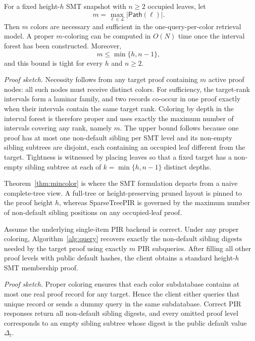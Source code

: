 \begin{theorem}
\label{thm:mincolor}
For a fixed height-$h$ SMT snapshot with $n\ge2$ occupied leaves, let
\[
    m=\max_{\ell\in\mathcal{L}}|\mathsf{Path}(\ell)|.
\]
Then $m$ colors are necessary and sufficient in the one-query-per-color retrieval model. A proper $m$-coloring can be computed in $O(N)$ time once the interval forest has been constructed. Moreover,
\[
m\le \min\{h,n-1\},
\]
and this bound is tight for every $h$ and $n\ge 2$.
\end{theorem}

\noindent\emph{Proof sketch.}
Necessity follows from any target proof containing $m$ active proof nodes: all such nodes must receive distinct colors. For sufficiency, the target-rank intervals form a laminar family, and two records co-occur in one proof exactly when their intervals contain the same target rank. Coloring by depth in the interval forest is therefore proper and uses exactly the maximum number of intervals covering any rank, namely $m$. The upper bound follows because one proof has at most one non-default sibling per SMT level and its non-empty sibling subtrees are disjoint, each containing an occupied leaf different from the target. Tightness is witnessed by placing leaves so that a fixed target has a non-empty sibling subtree at each of $k=\min\{h,n-1\}$ distinct depths.

\begin{remark}
Theorem~\ref{thm:mincolor} is where the SMT formulation departs from a naive complete-tree view. A full-tree or height-preserving pruned layout is pinned to the proof height $h$, whereas SparseTreePIR is governed by the maximum number of non-default sibling positions on any occupied-leaf proof.
\end{remark}

\begin{theorem}
\label{thm:correctness}
Assume the underlying single-item PIR backend is correct. Under any proper coloring, Algorithm~\ref{alg:query} recovers exactly the non-default sibling digests needed by the target proof using exactly $m$ PIR subqueries. After filling all other proof levels with public default hashes, the client obtains a standard height-$h$ SMT membership proof.
\end{theorem}

\noindent\emph{Proof sketch.}
Proper coloring ensures that each color subdatabase contains at most one real proof record for any target. Hence the client either queries that unique record or sends a dummy query in the same subdatabase. Correct PIR responses return all non-default sibling digests, and every omitted proof level corresponds to an empty sibling subtree whose digest is the public default value $\Delta_t$.

